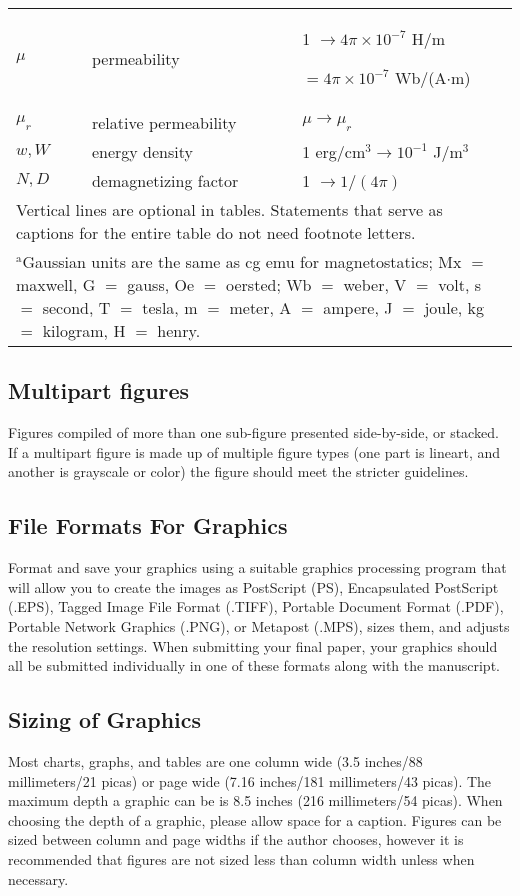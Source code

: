 \documentclass{IEEEtran}
\begin{document}
\begin{table}
\begin{tabular}{|p{25pt}|p{75pt}|p{115pt}|}
$\mu $& 
permeability& 
1 $\to  4\pi \times  10^{-7}$ H/m \par $= 4\pi \times  10^{-7}$ Wb/(A$\cdot $m) \\
$\mu_{r}$& 
relative permeability& 
$\mu \to \mu_{r}$ \\
$w, W$& 
energy density& 
1 erg/cm$^{3} \to  10^{-1}$ J/m$^{3}$ \\
$N, D$& 
demagnetizing factor& 
1 $\to  1/(4\pi )$ \\
\hline
\multicolumn{3}{p{251pt}}{Vertical lines are optional in tables. Statements that serve as captions for 
the entire table do not need footnote letters. }\\
\multicolumn{3}{p{251pt}}{$^{\mathrm{a}}$Gaussian units are the same as cg emu for magnetostatics; Mx 
$=$ maxwell, G $=$ gauss, Oe $=$ oersted; Wb $=$ weber, V $=$ volt, s $=$ 
second, T $=$ tesla, m $=$ meter, A $=$ ampere, J $=$ joule, kg $=$ 
kilogram, H $=$ henry.}
\end{tabular}
\label{tab1}
\end{table}

\subsection{Multipart figures}
Figures compiled of more than one sub-figure presented side-by-side, or 
stacked. If a multipart figure is made up of multiple figure
types (one part is lineart, and another is grayscale or color) the figure 
should meet the stricter guidelines.

\subsection{File Formats For Graphics}\label{formats}
Format and save your graphics using a suitable graphics processing program 
that will allow you to create the images as PostScript (PS), Encapsulated 
PostScript (.EPS), Tagged Image File Format (.TIFF), Portable Document 
Format (.PDF), Portable Network Graphics (.PNG), or Metapost (.MPS), sizes them, and adjusts 
the resolution settings. When 
submitting your final paper, your graphics should all be submitted 
individually in one of these formats along with the manuscript.

\subsection{Sizing of Graphics}
Most charts, graphs, and tables are one column wide (3.5 inches/88 
millimeters/21 picas) or page wide (7.16 inches/181 millimeters/43 
picas). The maximum depth a graphic can be is 8.5 inches (216 millimeters/54
picas). When choosing the depth of a graphic, please allow space for a 
caption. Figures can be sized between column and page widths if the author 
chooses, however it is recommended that figures are not sized less than 
column width unless when necessary. 
\end{document}
